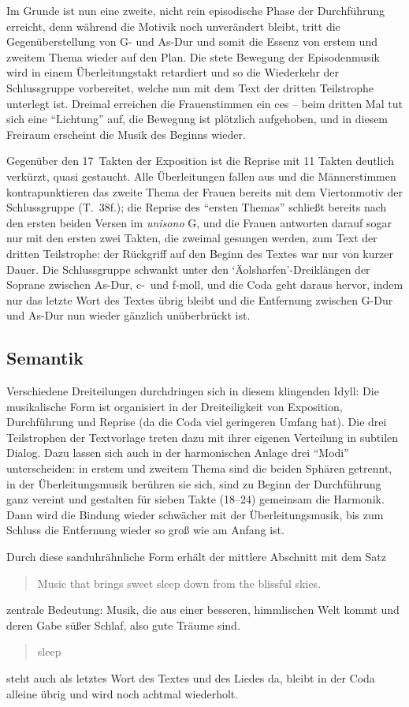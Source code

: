 \documentclass[a4paper,11pt,open=any]{scrbook}
\newcommand{\engquote}[1]{\foreignblockquote{english}{#1}}
\begin{document}
Im Grunde ist nun eine zweite, nicht rein episodische Phase der Durchführung
erreicht, denn während die Motivik noch unverändert bleibt, tritt die
Gegenüberstellung von G- und As-Dur und somit die Essenz von erstem und
zweitem Thema wieder auf den Plan.  Die stete Bewegung der Episodenmusik
wird in einem Überleitungstakt retardiert und so die Wiederkehr der
Schlussgruppe vorbereitet, welche nun mit dem Text der dritten Teilstrophe
unterlegt ist.  Dreimal erreichen die Frauenstimmen ein \textsf{ces} – beim
dritten Mal tut sich eine \enquote{Lichtung} auf, die Bewegung ist plötzlich
aufgehoben, und in diesem Freiraum erscheint die Musik des Beginns wieder.

Gegenüber den 17~Takten der Exposition ist die Reprise mit 11 Takten deutlich
verkürzt, quasi gestaucht.  Alle Überleitungen fallen aus und die Männerstimmen
kontrapunktieren das zweite Thema der Frauen bereits mit dem Viertonmotiv der
Schlussgruppe (T.~38f.); die Reprise des \enquote{ersten Themas} schließt
bereits nach den ersten beiden Versen im \textit{unisono} \textsf{G}, und
die Frauen antworten darauf sogar nur mit den ersten zwei Takten, die zweimal
gesungen werden, zum Text der dritten Teilstrophe: der Rückgriff auf den
Beginn des Textes war nur von kurzer Dauer.  Die Schlussgruppe schwankt
unter den \enquote*{Äolsharfen}-Dreiklängen der Soprane zwischen As-Dur,
c-~und f-moll, und die Coda geht daraus hervor, indem nur das letzte Wort
des Textes übrig bleibt und die Entfernung zwischen G-Dur und As-Dur nun
wieder gänzlich unüberbrückt ist.

\subsection*{Semantik}
Verschiedene Dreiteilungen durchdringen sich in diesem klingenden Idyll:
Die musikalische Form ist organisiert in der Dreiteiligkeit von Exposition,
Durchführung und Reprise (da die Coda viel geringeren Umfang hat).  Die
drei Teilstrophen der Textvorlage treten dazu mit ihrer eigenen Verteilung
in subtilen Dialog.  Dazu lassen sich auch in der harmonischen Anlage drei
\enquote{Modi} unterscheiden: in erstem und zweitem Thema sind die beiden
Sphären getrennt, in der Überleitungsmusik berühren sie sich, sind zu Beginn
der Durchführung ganz vereint und gestalten für sieben Takte (18–24) gemeinsam
die Harmonik.  Dann wird die Bindung wieder schwächer mit der Überleitungsmusik,
bis zum Schluss die Entfernung wieder so groß wie am Anfang ist.

Durch diese sanduhrähnliche Form erhält der mittlere Abschnitt mit dem
Satz \engquote{Music that brings sweet sleep down from the blissful skies.}
zentrale Bedeutung: Musik, die aus einer besseren, himmlischen Welt kommt
und deren Gabe süßer Schlaf, also gute Träume sind.  \engquote{sleep} steht
auch als letztes Wort des Textes und des Liedes da, bleibt in der Coda
alleine übrig und wird noch achtmal wiederholt.
\end{document}
